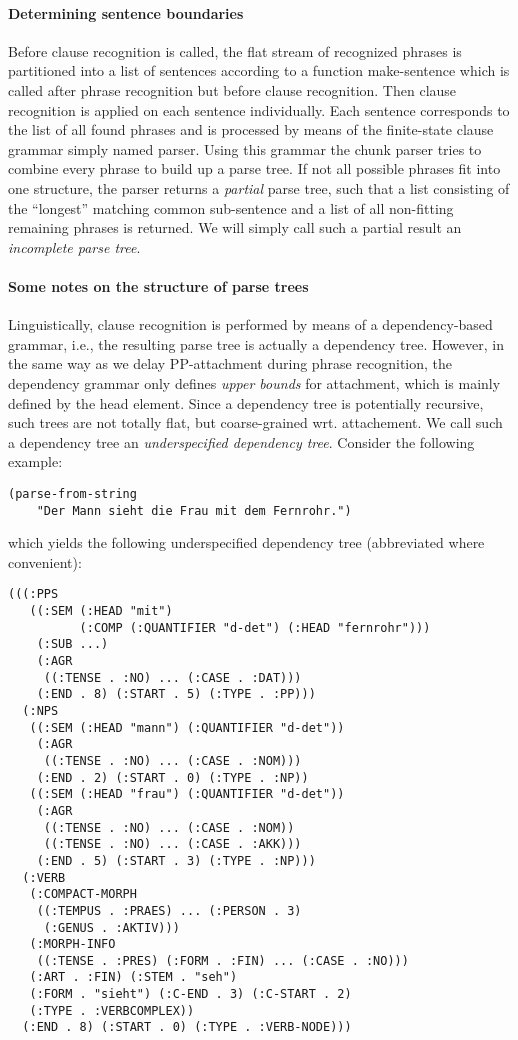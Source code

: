 \paragraph{Determining sentence boundaries}
Before clause
recognition is called, the flat stream of recognized phrases is
partitioned into a list of 
sentences according to a function {\sc make-sentence}
which is called after phrase recognition but before clause recognition.
Then clause recognition is applied on each sentence individually. Each
sentence corresponds to the list of all found phrases and is processed
by means of the finite-state clause grammar simply named {\sc parser}.
Using this grammar the chunk parser tries to combine every phrase to
build up a parse tree. If not all possible phrases fit into one
structure, the parser returns a {\em partial} parse tree, such that a list
consisting of the ``longest'' matching common sub-sentence and a list
of all non-fitting remaining phrases is returned. We will simply call such a
partial result an {\em incomplete parse tree}.

\paragraph{Some notes on the structure of parse trees}
Linguistically, clause recognition is performed by means of a
dependency-based grammar, i.e., the resulting parse tree is actually a
dependency tree. However, in the same way as we delay PP-attachment
during phrase recognition, the dependency grammar only defines {\em
upper bounds} for attachment, which is mainly defined by the head
element. Since a dependency tree is potentially recursive, such trees are not
totally flat, but coarse-grained wrt. attachement. We call such a
dependency tree an {\em underspecified dependency tree}.
Consider the following example:

\begin{verbatim}
(parse-from-string 
    "Der Mann sieht die Frau mit dem Fernrohr.")
 \end{verbatim}

\noindent which yields the following underspecified dependency tree 
(abbreviated where convenient):

\begin{verbatim}
(((:PPS
   ((:SEM (:HEAD "mit") 
          (:COMP (:QUANTIFIER "d-det") (:HEAD "fernrohr")))
    (:SUB ...)
    (:AGR
     ((:TENSE . :NO) ... (:CASE . :DAT)))
    (:END . 8) (:START . 5) (:TYPE . :PP)))
  (:NPS
   ((:SEM (:HEAD "mann") (:QUANTIFIER "d-det"))
    (:AGR
     ((:TENSE . :NO) ... (:CASE . :NOM)))
    (:END . 2) (:START . 0) (:TYPE . :NP))
   ((:SEM (:HEAD "frau") (:QUANTIFIER "d-det"))
    (:AGR
     ((:TENSE . :NO) ... (:CASE . :NOM))
     ((:TENSE . :NO) ... (:CASE . :AKK)))
    (:END . 5) (:START . 3) (:TYPE . :NP)))
  (:VERB
   (:COMPACT-MORPH
    ((:TEMPUS . :PRAES) ... (:PERSON . 3)
     (:GENUS . :AKTIV)))
   (:MORPH-INFO
    ((:TENSE . :PRES) (:FORM . :FIN) ... (:CASE . :NO)))
   (:ART . :FIN) (:STEM . "seh") 
   (:FORM . "sieht") (:C-END . 3) (:C-START . 2)
   (:TYPE . :VERBCOMPLEX))
  (:END . 8) (:START . 0) (:TYPE . :VERB-NODE)))

\end{verbatim}


